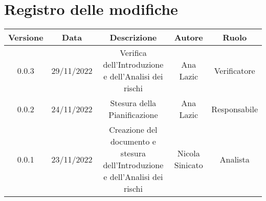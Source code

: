\section*{Registro delle modifiche}
\begin{center}
\begin{tabular}{| c | c | c | c | c |} 
\hline
 \textbf{Versione} & \textbf{Data} & \textbf{Descrizione} & \textbf{Autore} & \textbf{Ruolo}\\
  \hline
0.0.3 & 29/11/2022 & Verifica dell'Introduzione e dell'Analisi dei rischi & Ana Lazic & Verificatore\\
 \hline
0.0.2 & 24/11/2022 & Stesura della Pianificazione & Ana Lazic & Responsabile\\
 \hline
0.0.1 & 23/11/2022 & Creazione del documento e stesura dell'Introduzione e dell'Analisi dei rischi & Nicola Sinicato & Analista\\
 \hline
\end{tabular}
\end{center}
